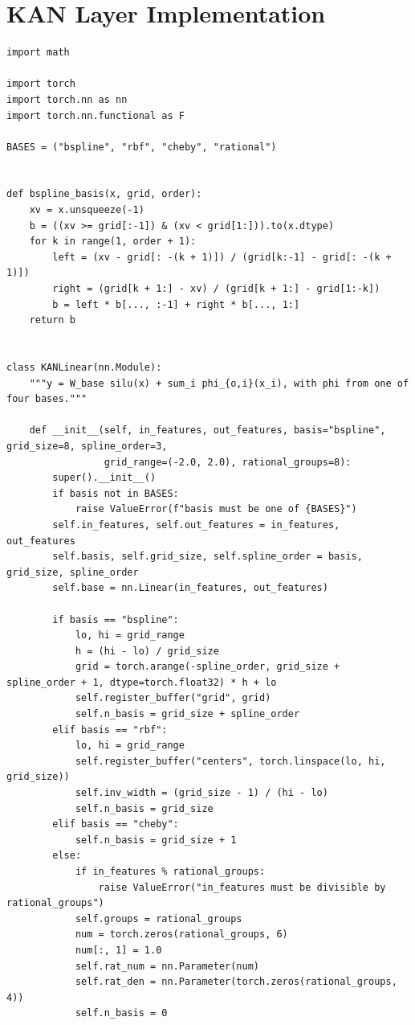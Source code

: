 \documentclass[12pt,a4paper]{report}
\begin{document}
% 
% 
\appendix

\chapter{KAN Layer Implementation}
\label{app:kan}

\begin{lstlisting}[style=pythonstyle, caption={KAN layer, residual block and MLP control (\texttt{kanrec/kan.py}).}]
import math

import torch
import torch.nn as nn
import torch.nn.functional as F

BASES = ("bspline", "rbf", "cheby", "rational")


def bspline_basis(x, grid, order):
    xv = x.unsqueeze(-1)
    b = ((xv >= grid[:-1]) & (xv < grid[1:])).to(x.dtype)
    for k in range(1, order + 1):
        left = (xv - grid[: -(k + 1)]) / (grid[k:-1] - grid[: -(k + 1)])
        right = (grid[k + 1:] - xv) / (grid[k + 1:] - grid[1:-k])
        b = left * b[..., :-1] + right * b[..., 1:]
    return b


class KANLinear(nn.Module):
    """y = W_base silu(x) + sum_i phi_{o,i}(x_i), with phi from one of four bases."""

    def __init__(self, in_features, out_features, basis="bspline", grid_size=8, spline_order=3,
                 grid_range=(-2.0, 2.0), rational_groups=8):
        super().__init__()
        if basis not in BASES:
            raise ValueError(f"basis must be one of {BASES}")
        self.in_features, self.out_features = in_features, out_features
        self.basis, self.grid_size, self.spline_order = basis, grid_size, spline_order
        self.base = nn.Linear(in_features, out_features)

        if basis == "bspline":
            lo, hi = grid_range
            h = (hi - lo) / grid_size
            grid = torch.arange(-spline_order, grid_size + spline_order + 1, dtype=torch.float32) * h + lo
            self.register_buffer("grid", grid)
            self.n_basis = grid_size + spline_order
        elif basis == "rbf":
            lo, hi = grid_range
            self.register_buffer("centers", torch.linspace(lo, hi, grid_size))
            self.inv_width = (grid_size - 1) / (hi - lo)
            self.n_basis = grid_size
        elif basis == "cheby":
            self.n_basis = grid_size + 1
        else:
            if in_features % rational_groups:
                raise ValueError("in_features must be divisible by rational_groups")
            self.groups = rational_groups
            num = torch.zeros(rational_groups, 6)
            num[:, 1] = 1.0
            self.rat_num = nn.Parameter(num)
            self.rat_den = nn.Parameter(torch.zeros(rational_groups, 4))
            self.n_basis = 0


\end{lstlisting}
\end{document}

